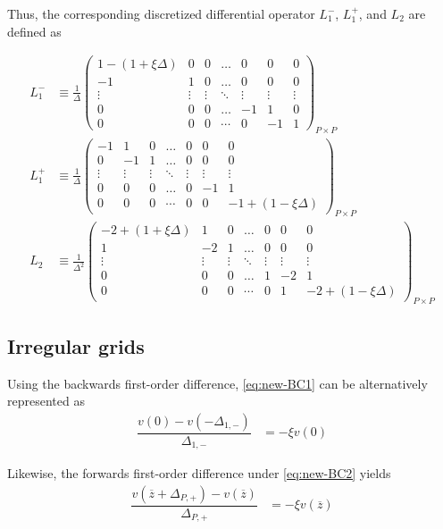 \documentclass[11pt]{article}
\begin{document}
Thus, the corresponding discretized differential operator $L_1^{-}$, $L_1^{+}$, and $L_2$ are defined as 

\begin{align}
L_1^{-} &\equiv \frac{1}{\Delta}\begin{pmatrix}
1 - (1 + \xi \Delta) &0&0&\dots&0&0&0\\
-1&1&0&\dots&0&0&0\\
\vdots&\vdots&\vdots&\ddots&\vdots&\vdots&\vdots\\
0&0&0&\dots&-1&1&0\\
0&0&0&\cdots&0&-1&1
\end{pmatrix}_{P\times P}\label{eq:L-1-regular} \\
L_1^{+} &\equiv \frac{1}{\Delta}\begin{pmatrix}
-1&1&0&\dots&0&0&0\\
0&-1&1&\dots&0&0&0\\
\vdots&\vdots&\vdots&\ddots&\vdots&\vdots&\vdots\\
0&0&0&\dots&0&-1&1\\
0&0&0&\cdots&0&0&-1+(1-\xi \Delta)
\end{pmatrix}_{P\times P}\label{eq:L-1-plus-regular} \\
L_2 &\equiv \frac{1}{\Delta^2}\begin{pmatrix}
-2 + (1 + \xi\Delta) &1&0&\dots&0&0&0\\
1&-2&1&\dots&0&0&0\\
\vdots&\vdots&\vdots&\ddots&\vdots&\vdots&\vdots\\
0&0&0&\dots&1&-2&1\\
0&0&0&\cdots&0&1&-2 + (1- \xi\Delta)
\end{pmatrix}_{P\times P}\label{eq:L-2-regular}
\end{align}

\subsection{Irregular grids}
Using the backwards first-order difference, \eqref{eq:new-BC1} can be alternatively represented as
\begin{align}
\dfrac{v(0) - v(-\Delta_{1, -})}{\Delta_{1, -}} &= - \xi v(0)
\end{align}

Likewise, the forwards first-order difference under \eqref{eq:new-BC2} yields
\begin{align}
\dfrac{v(\overline{z} + \Delta_{P, +}) - v( \overline{z})}{\Delta_{P, +}} &= - \xi v(\overline{z})
\end{align}
\end{document}
